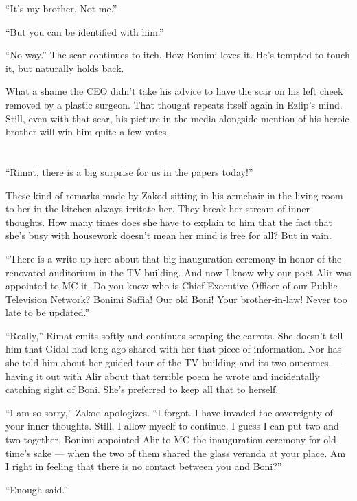 \documentclass[twoside,11pt,openany]{book}
\begin{document}
``It's my brother. Not me.''

``But you can be identified with him.''

``No way.'' The scar continues to itch. How Bonimi loves it. He's tempted to touch it, but
naturally holds back.

What a shame the CEO didn't take his advice to have the scar on his left cheek
removed by a plastic surgeon. That
thought repeats itself again in Ezlip's mind. Still, even with that scar, his picture in the media alongside mention of
his heroic brother will win him quite a few votes.



\chapter{}

``Rimat, there is a big surprise for us in the papers today!''

These kind of remarks made by Zakod sitting in his armchair in the living room to her in the kitchen always irritate
her. They break her stream of inner thoughts. { }How many times does
she have to explain{ }to him that the fact that she's busy with housework
doesn't mean her mind is free for all? But in vain.

``There is a write-up here about that big inauguration ceremony in honor of the renovated auditorium in the
TV building. And now I know why our poet Alir was appointed to MC it. Do you know who is Chief Executive Officer of
our Public Television Network? Bonimi Saffia! Our old Boni! Your brother-in-law! Never too late to be
updated.''

``Really,'' Rimat emits softly and continues scraping the carrots. She doesn't tell him that
Gidal had long ago shared with her that piece of information. Nor has she told him about her guided tour of the TV
building and its two outcomes --- having it out with Alir about that terrible poem he wrote and incidentally catching
sight of Boni. She's preferred to keep all that to herself.

``I am so sorry,'' Zakod apologizes. ``I forgot. I have invaded the sovereignty
of your inner thoughts. Still, I allow myself to continue. I guess I can put two and two together. Bonimi appointed
Alir to MC the inauguration ceremony for old time{'s} sake --- when the two of them shared the glass veranda at your
place. Am I right in feeling that there is no contact between you and Boni?''

``Enough said.''
\end{document}
